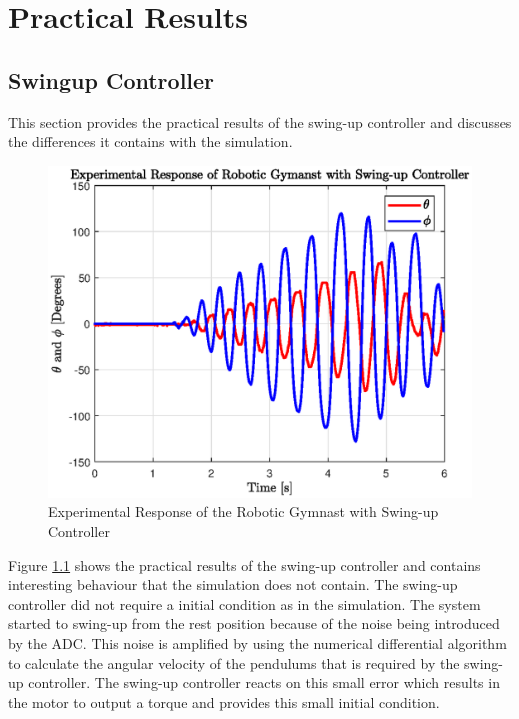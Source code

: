\chapter{Practical Results}
\label{chp:prac_results}






\section{Swingup Controller}
This section provides the practical results of the swing-up controller and discusses the differences it contains with the simulation. \\

\begin{figure}[h]
	\centering
	\includegraphics[scale=1]{./figs/experiment_swingup.eps}
	\caption{Experimental Response of the Robotic Gymnast with Swing-up Controller}
	\label{fig:experiment_swingup}
\end{figure}


Figure \ref{fig:experiment_swingup} shows the practical results of the swing-up controller and contains interesting behaviour that the simulation does not contain. The swing-up controller did not require a initial condition as in the simulation. The system started to swing-up from the rest position because of the noise being introduced by the ADC. This noise is amplified by using the numerical differential algorithm to calculate the angular velocity of the pendulums that is required by the swing-up controller. The swing-up controller reacts on this small error which results in the motor to output a torque and provides this small initial condition.\\




